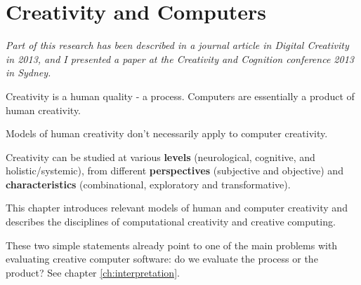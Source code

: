 
\chapter{Creativity and Computers}
\label{ch:creativity}

\emph{Part of this research has been described in a journal article in Digital Creativity in 2013, and I presented a paper at the Creativity and Cognition conference 2013 in Sydney.}

\grule


Creativity is a human quality - a process. Computers are essentially a product of human creativity.

Models of human creativity don't necessarily apply to computer creativity.

Creativity can be studied at various \textbf{levels} (neurological, cognitive, and holistic/systemic), from different \textbf{perspectives} (subjective and objective) and \textbf{characteristics} (combinational, exploratory and transformative).

This chapter introduces relevant models of human and computer creativity and describes the disciplines of computational creativity and creative computing.

\begin{draft}
  These two simple statements already point to one of the main problems with evaluating creative computer software: do we evaluate the process or the product? See chapter \ref{ch:interpretation}.
\end{draft}


\clearpage

\vspace*{\fill}

